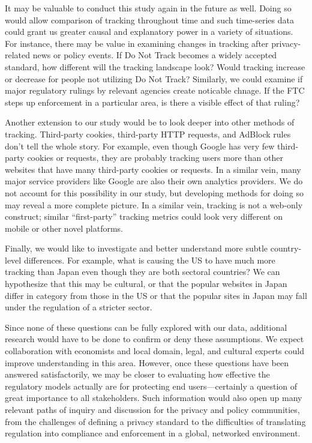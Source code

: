 \documentclass[conference]{IEEEtran}
\begin{document}
It may be valuable to conduct this study again in the future as well. Doing so would allow comparison of tracking throughout time and such time-series data could grant us greater causal and explanatory power in a variety of situations. For instance, there may be value in examining changes in tracking after privacy-related news or policy events. If Do Not Track becomes a widely accepted standard, how different will the tracking landscape look? Would tracking increase or decrease for people not utilizing Do Not Track? Similarly, we could examine if major regulatory rulings by relevant agencies create noticable chnage. If the FTC steps up enforcement in a particular area, is there a visible effect of that ruling?

Another extension to our study would be to look deeper into other methods of tracking. Third-party cookies, third-party HTTP requests, and AdBlock rules don't tell the whole story. For example, even though Google has very few third-party cookies or requests, they are probably tracking users more than other websites that have many third-party cookies or requests. In a similar vein, many major service providers like Google are also their own analytics providers. We do not account for this possibility in our study, but developing methods for doing so may reveal a more complete picture. In a similar vein, tracking is not a web-only construct; similar ``first-party'' tracking metrics could look very different on mobile or other novel platforms.

Finally, we would like to investigate and better understand more subtle country-level differences. For example, what is causing the US to have much more tracking than Japan even though they are both sectoral countries? We can hypothesize that this may be cultural, or that the popular websites in Japan differ in category from those in the US or that the popular sites in Japan may fall under the regulation of a stricter sector.

Since none of these questions can be fully explored with our data, additional research would have to be done to confirm or deny these assumptions. We expect collaboration with economists and local domain, legal, and cultural experts could improve understanding in this area. However, once these questions have been answered satisfactorily, we may be closer to evaluating how effective the regulatory models actually are for protecting end users---certainly a question of great importance to all stakeholders. Such information would also open up many relevant paths of inquiry and discussion for the privacy and policy communities, from the challenges of defining a privacy standard to the difficulties of translating regulation into compliance and enforcement in a global, networked environment.
\end{document}
